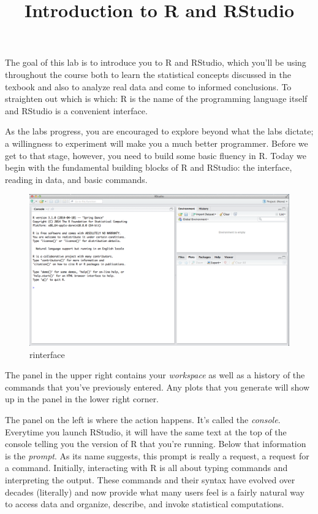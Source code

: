 \documentclass[]{article}
\title{Introduction to R and RStudio}
\author{}
\date{}
\begin{document}
\maketitle

The goal of this lab is to introduce you to R and RStudio, which you'll
be using throughout the course both to learn the statistical concepts
discussed in the texbook and also to analyze real data and come to
informed conclusions. To straighten out which is which: R is the name of
the programming language itself and RStudio is a convenient interface.

As the labs progress, you are encouraged to explore beyond what the labs
dictate; a willingness to experiment will make you a much better
programmer. Before we get to that stage, however, you need to build some
basic fluency in R. Today we begin with the fundamental building blocks
of R and RStudio: the interface, reading in data, and basic commands.

\begin{figure}
\centering
\includegraphics{more/rInterface2014.png}
\caption{rinterface}
\end{figure}

The panel in the upper right contains your \emph{workspace} as well as a
history of the commands that you've previously entered. Any plots that
you generate will show up in the panel in the lower right corner.

The panel on the left is where the action happens. It's called the
\emph{console}. Everytime you launch RStudio, it will have the same text
at the top of the console telling you the version of R that you're
running. Below that information is the \emph{prompt}. As its name
suggests, this prompt is really a request, a request for a command.
Initially, interacting with R is all about typing commands and
interpreting the output. These commands and their syntax have evolved
over decades (literally) and now provide what many users feel is a
fairly natural way to access data and organize, describe, and invoke
statistical computations.
\end{document}
